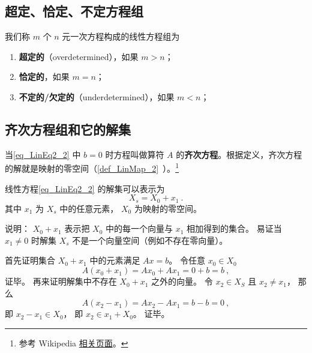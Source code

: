\subsection{超定、恰定、不定方程组}

我们称 $m$ 个 $n$ 元一次方程构成的线性方程组为
\begin{enumerate}
\item \textbf{超定的}（overdetermined），如果 $m > n$；
\item \textbf{恰定的}，如果 $m = n$；
\item \textbf{不定的/欠定的}（underdetermined），如果 $m < n$；
\end{enumerate}


\subsection{齐次方程组和它的解集}






当\autoref{eq_LinEq2_2} 中 $b = 0$ 时方程叫做算符 $A$ 的\textbf{齐次方程}。根据定义，齐次方程的解就是映射的零空间（\autoref{def_LinMap_2}~）。\footnote{参考 Wikipedia \href{https://en.wikipedia.org/wiki/Kernel_(linear_algebra)}{相关页面}。}

\begin{theorem}{}\label{the_LinEq2_1}
线性方程\autoref{eq_LinEq2_2} 的解集可以表示为
\begin{equation}\label{eq_LinEq2_1}
X_s = X_0 + x_1~.
\end{equation}
其中 $x_1$ 为 $X_s$ 中的任意元素，  $X_0$ 为映射的零空间。
\end{theorem}
说明： $X_0 + x_1$ 表示把 $X_0$ 中的每一个向量与 $x_1$ 相加得到的集合。 易证当 $x_1 \ne 0$ 时解集 $X_s$ 不是一个向量空间（例如不存在零向量）。

首先证明集合 $X_0 + x_1$ 中的元素满足 $Ax = b$。 令任意 $x_0 \in X_0$
\begin{equation}
A(x_0 + x_1) = Ax_0 + Ax_1 = 0 + b = b~,
\end{equation}
证毕。 再来证明解集中不存在 $X_0 + x_1$ 之外的向量。 令 $x_2 \in X_S$ 且 $x_2 \ne x_1$， 那么
\begin{equation}
A(x_2 - x_1) = Ax_2 - Ax_1 = b - b = 0~,
\end{equation}
即 $x_2 - x_1 \in X_0$， 即 $x_2 \in x_1 + X_0$。 证毕。


